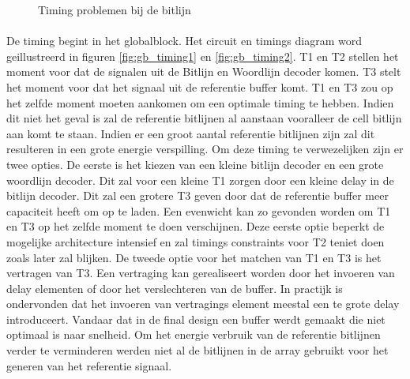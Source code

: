 \begin{figure}[!ht]
\centering
{}
\caption{Timing problemen bij de bitlijn}
\end{figure}

\paragraph{}
De timing begint in het globalblock. Het circuit en timings diagram word geillustreerd in figuren \ref{fig:gb_timing1} en \ref{fig:gb_timing2}. T1 en T2 stellen het moment voor dat de signalen uit de Bitlijn en Woordlijn decoder komen. T3 stelt het moment voor dat het signaal uit de referentie buffer komt. T1 en T3 zou op het zelfde moment moeten aankomen om een optimale timing te hebben. Indien dit niet het geval is zal de referentie bitlijnen al aanstaan vooralleer de cell bitlijn aan komt te staan. Indien er een groot aantal referentie bitlijnen zijn zal dit resulteren in een grote energie verspilling. Om deze timing te verwezelijken zijn er twee opties. De eerste is het kiezen van een kleine bitlijn decoder en een grote woordlijn decoder. Dit zal voor een kleine T1 zorgen door een kleine delay in de bitlijn decoder. Dit zal een grotere T3 geven door dat de referentie buffer meer capaciteit heeft om op te laden. Een evenwicht kan zo gevonden worden om T1 en T3 op het zelfde moment te doen verschijnen. Deze eerste optie beperkt de mogelijke architecture intensief en zal timings constraints voor T2 teniet doen zoals later zal blijken. De tweede optie voor het matchen van T1 en T3 is het vertragen van T3. Een vertraging kan gerealiseert worden door het invoeren van delay elementen of door het verslechteren van de buffer. In practijk is ondervonden dat het invoeren van vertragings element meestal een te grote delay introduceert. Vandaar dat in de final design een buffer werdt gemaakt die niet optimaal is naar snelheid. Om het energie verbruik van de referentie bitlijnen verder te verminderen werden niet al de bitlijnen in de array gebruikt voor het generen van het referentie signaal.


